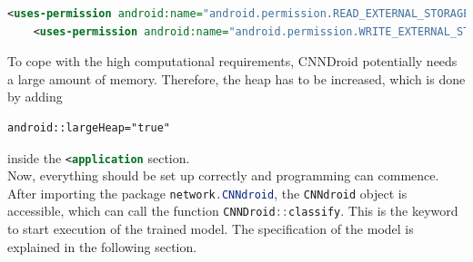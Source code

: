 \begin{lstlisting}[language=XML, basicstyle=\scriptsize]
    <uses-permission android:name="android.permission.READ_EXTERNAL_STORAGE"/>
    <uses-permission android:name="android.permission.WRITE_EXTERNAL_STORAGE"/>
\end{lstlisting}

To cope with the high computational requirements, CNNDroid potentially needs a large amount of memory. Therefore, the heap has to be increased, which is done by adding

\begin{lstlisting}[language=XML, basicstyle=\scriptsize]
    android::largeHeap="true"
\end{lstlisting}
\noindent
inside the \lstinline[language=XML]{<application} section.\\
Now, everything should be set up correctly and programming can commence.\\
After importing the package \lstinline[language=Java]{network.CNNdroid}, the \lstinline[language=Java]{CNNdroid} object is accessible, which can call the function \lstinline[language=Java]{CNNDroid::classify}. This is the keyword to start execution of the trained model. The specification of the model is explained in the following section.

